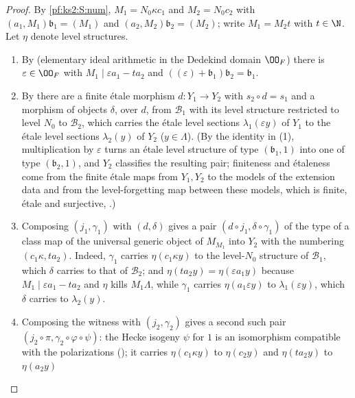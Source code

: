\begin{proof}
By \ref{pf:ks2:S:num}, $M_1=N_0\kappa c_1$ and $M_2=N_0c_2$ with $(a_1,M_1)\mathfrak b_1=(M_1)$ and
$(a_2,M_2)\mathfrak b_2=(M_2)$; write $M_1=M_2t$ with $t\in\N$. Let $\eta$ denote level structures.
\begin{enumerate}
\item By  (elementary ideal arithmetic in the
  Dedekind domain $\kstwoOF$) there is $\varepsilon\in\kstwoOF$ with $M_1\mid\varepsilon a_1-ta_2$ and
  $((\varepsilon)+\mathfrak b_1)\mathfrak b_2=\mathfrak b_1$.
\item By  there are a finite \'etale morphism
  $d\colon Y_1\to Y_2$ with $s_2\circ d=s_1$ and a morphism of objects $\delta$, over $d$, from
  $\mathcal B_1$ with its level structure restricted to level $N_0$ to $\mathcal B_2$, which carries
  the \'etale level sections $\lambda_1(\varepsilon y)$ of $Y_1$ to the \'etale level sections
  $\lambda_2(y)$ of $Y_2$ ($y\in\Lambda$). (By the identity in (1), multiplication by $\varepsilon$
  turns an \'etale level structure of type $(\mathfrak b_1,1)$ into one of type $(\mathfrak b_2,1)$, and
  $Y_2$ classifies the resulting pair; finiteness and \'etaleness come from the finite \'etale maps
  from $Y_1,Y_2$ to the models of the extension data and from the level-forgetting map between these
  models, which is finite, \'etale and surjective,
  .)
\item Composing $(j_1,\gamma_1)$ with $(d,\delta)$ gives a pair $(d\circ j_1,\delta\circ\gamma_1)$ of
  the type of a class map of the universal generic object of $M_{M_1}$ into $Y_2$ with the numbering
  $(c_1\kappa,ta_2)$. Indeed, $\gamma_1$ carries $\eta(c_1\kappa y)$ to the level-$N_0$ structure of
  $\mathcal B_1$, which $\delta$ carries to that of $\mathcal B_2$; and $\eta(ta_2y)=\eta(\varepsilon
  a_1y)$ because $M_1\mid\varepsilon a_1-ta_2$ and $\eta$ kills $M_1\Lambda$, while $\gamma_1$ carries
  $\eta(a_1\varepsilon y)$ to $\lambda_1(\varepsilon y)$, which $\delta$ carries to $\lambda_2(y)$.
\item Composing the witness with $(j_2,\gamma_2)$ gives a second such pair $(j_2\circ\pi,
  \gamma_2\circ\varphi\circ\psi)$: the Hecke isogeny $\psi$ for $1$ is an isomorphism compatible with
  the polarizations (); it carries
  $\eta(c_1\kappa y)$ to $\eta(c_2y)$ and $\eta(ta_2y)$ to $\eta(a_2y)$

\end{enumerate}
\end{proof}
